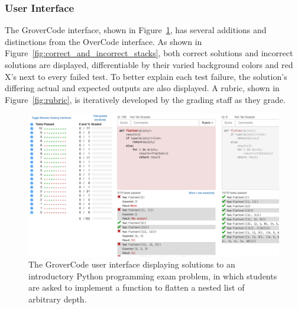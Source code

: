 \subsubsection{User Interface}

The GroverCode interface, shown in Figure~\ref{fig:whole_interface}, has several additions and distinctions from the OverCode interface. As shown in Figure~\ref{fig:correct_and_incorrect_stacks}, both correct solutions and incorrect solutions are displayed, differentiable by their varied background colors and red X's next to every failed test. To better explain each test failure, the solution's differing actual and expected outputs are also displayed. A rubric, shown in Figure~\ref{fig:rubric}, is iteratively developed by the grading staff as they grade.

\begin{figure}
\centering
\includegraphics[width=\textwidth]{Body/figures/grovercode/figure_1}
\caption{The GroverCode user interface displaying solutions to an introductory Python programming exam problem, in which students are asked to implement a function to flatten a nested list of arbitrary depth.
}
\label{fig:whole_interface}
\end{figure} 


